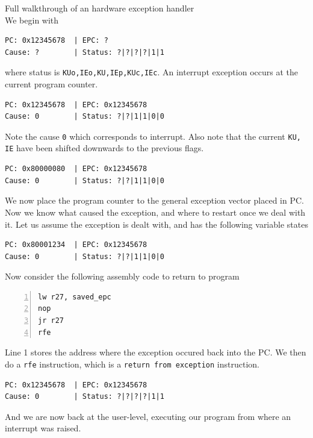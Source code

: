 \documentclass[journal, letterpaper]{IEEEtran}
\begin{document}
\begin{example}{Full walkthrough of an hardware exception handler} \\
    We begin with
\begin{verbatim}
PC: 0x12345678  | EPC: ?
Cause: ?        | Status: ?|?|?|?|1|1
\end{verbatim}
where status is \verb|KUo,IEo,KU,IEp,KUc,IEc|. An interrupt exception occurs at the current
program counter.
\begin{verbatim}
PC: 0x12345678  | EPC: 0x12345678
Cause: 0        | Status: ?|?|1|1|0|0 
\end{verbatim}
Note the cause \verb|0| which corresponds to interrupt. Also note that the current \verb|KU, IE| have been shifted downwards to the previous flags.
\begin{verbatim}
PC: 0x80000080  | EPC: 0x12345678
Cause: 0        | Status: ?|?|1|1|0|0 
\end{verbatim}
We now place the program counter to the general exception vector placed in PC. Now we know what caused the exception, and where to restart once we deal with it. Let us assume the exception is dealt with,
and has the following variable states
\begin{verbatim}
PC: 0x80001234  | EPC: 0x12345678
Cause: 0        | Status: ?|?|1|1|0|0 
\end{verbatim}
Now consider the following assembly code to return to program
    \begin{Verbatim}[numbers=left, numbersep=2mm, frame=single]
lw r27, saved_epc
nop
jr r27
rfe
    \end{Verbatim}
    Line 1 stores the address where the exception occured back into the PC. We then do a \verb|rfe| instruction, which is a \verb|return from exception| instruction.
\begin{verbatim}
PC: 0x12345678  | EPC: 0x12345678
Cause: 0        | Status: ?|?|?|?|1|1 
\end{verbatim}
And we are now back at the user-level, executing our program from where an interrupt was raised.
\end{example}
\end{document}
